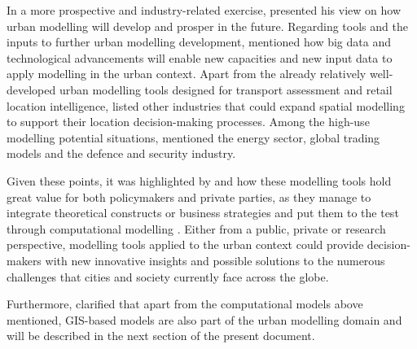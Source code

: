 \documentclass[12pt, a4paper]{report}
\begin{document}

In a more prospective and industry-related exercise, \cite{wilsonFutureUrbanModelling2018} presented his view on how urban modelling will develop and prosper in the future. Regarding tools and the inputs to further urban modelling development, \cite{wilsonFutureUrbanModelling2018} mentioned how big data and technological advancements will enable new capacities and new input data to apply modelling in the urban context. Apart from the already relatively well-developed urban modelling tools designed for transport assessment and retail location intelligence, \cite{wilsonFutureUrbanModelling2018} listed other industries that could expand spatial modelling to support their location decision-making processes. Among the high-use modelling potential situations, \cite{wilsonFutureUrbanModelling2018} mentioned the energy sector, global trading models and the defence and security industry.


Given these points, it was highlighted by \cite{battyUrbanModeling2009a} and \cite{wilsonFutureUrbanModelling2018} how these modelling tools hold great value for both policymakers and private parties, as they manage to integrate theoretical constructs or business strategies and put them to the test through computational modelling \citep{battyUrbanModeling2009a}. Either from a public, private or research perspective, modelling tools applied to the urban context could provide decision-makers with new innovative insights and possible solutions to the numerous challenges that cities and society currently face across the globe.

Furthermore, \cite{battyUrbanModeling2009a} clarified that apart from the computational models above mentioned, GIS-based models are also part of the urban modelling domain and will be described in the next section of the present document.





\end{document}
